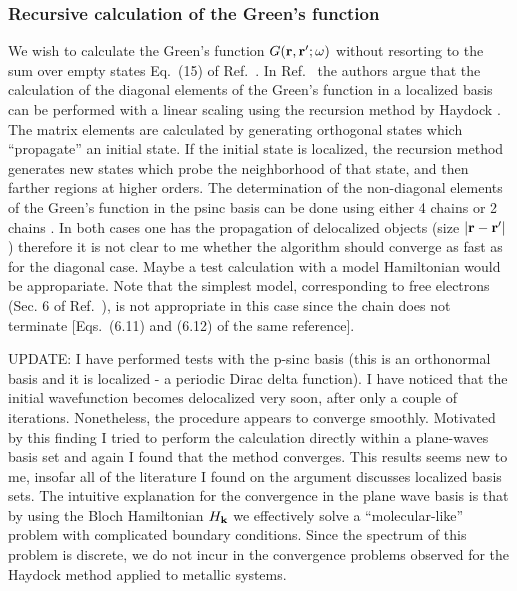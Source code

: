 \documentclass[12pt]{article}
\def\k{{\bf k}}
\def\r{{\bf r}}
\def\rp{{\bf r}^\prime}
\def\w{\omega}
\begin{document}
\subsubsection*{Recursive calculation of the Green's function}

We wish to calculate the Green's function $G(\r,\rp;\w)$ without resorting 
to the sum over empty states Eq.\ (15) of Ref.\ \cite{hl86}. 
In Ref.\ \cite{bg92} the authors argue that the calculation of the
diagonal elements of the Green's function in a localized basis can be performed with a linear scaling
using the recursion method by Haydock \cite{haydock.ssp,kelly.ssp}. The matrix elements are calculated
by generating orthogonal states which ``propagate'' an initial state. 
If the initial state is localized, the recursion method generates new 
states which probe the neighborhood of that state, and then farther
regions at higher orders. 
%
The determination of the non-diagonal elements of the Green's function 
in the psinc basis can be done using either 4 chains \cite{haydock.ssp} 
or 2 chains \cite{ballentine}. In both cases one has the propagation 
of delocalized objects (size $|\r-\rp|$) therefore it is not clear to me
whether the algorithm should converge as fast as for the diagonal case. Maybe a test calculation
with a model Hamiltonian would be appropariate. Note that the simplest model, corresponding to
free electrons (Sec. 6 of Ref.\ \cite{haydock.ssp}), is not appropriate in this case since the
chain does not terminate [Eqs.\ (6.11) and (6.12) of the same reference].

\noindent
UPDATE: I have performed tests with the p-sinc basis \cite{mostofi} 
(this is an orthonormal basis and it is localized - a periodic Dirac delta function). 
I have noticed that the initial
wavefunction becomes delocalized very soon, after only a couple of iterations.
Nonetheless, the procedure appears to converge smoothly. Motivated by this finding
I tried to perform the calculation directly within a plane-waves basis set
and again I found that the method converges. This results seems new to me, insofar
all of the literature I found on the argument discusses localized basis sets.
The intuitive explanation for the convergence in the plane wave basis is that
by using the Bloch Hamiltonian $H_\k$ we effectively solve a ``molecular-like''
problem with complicated boundary conditions. Since the spectrum of this problem
is discrete, we do not incur in the convergence problems observed for the Haydock
method applied to metallic systems.
\end{document}
